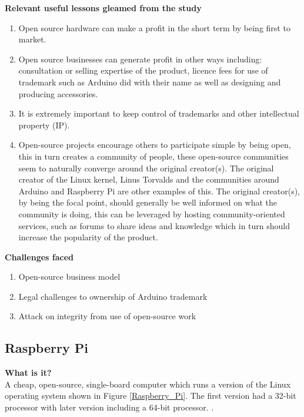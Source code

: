 \textbf{Relevant useful lessons gleamed from the study}
\begin{enumerate}
\item Open source hardware can make a profit in the short term by being first to market.
\item Open source businesses can generate profit in other ways including: consultation or selling expertise of the product, licence fees for use of trademark such as Arduino did with their name as well as designing and producing accessories.
\item It is extremely important to keep control of trademarks and other intellectual property (IP).
\item Open-source projects encourage others to participate simple by being open, this in turn creates a community of people, these open-source communities seem to naturally converge around the original creator(s). The original creator of the Linux kernel, Linus Torvalds and the communities around Arduino and Raspberry Pi are other examples of this. The original creator(s), by being the focal point, should generally be well informed on what the community is doing, this can be leveraged by hosting community-oriented services, such as forums to share ideas and knowledge which in turn should increase the popularity of the product. \\
\end{enumerate}

\textbf{Challenges faced}
\begin{enumerate}
\item Open-source business model
\item Legal challenges to ownership of Arduino trademark
\item Attack on integrity from use of open-source work
\end{enumerate}

\subsection{Raspberry Pi}
\textbf{What is it?}\\
A cheap, open-source, single-board computer which runs a version of the Linux operating system shown in Figure \ref{Raspberry_Pi}. The first version had a 32-bit processor with later version including a 64-bit processor.
\cite{RN99}.\\

